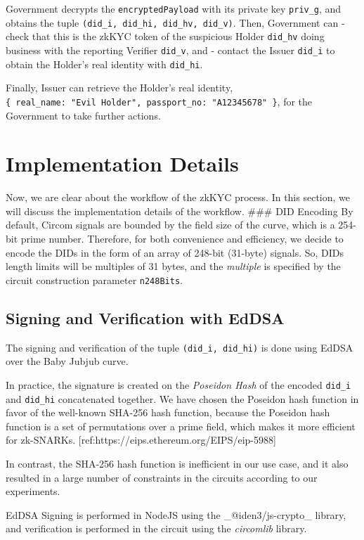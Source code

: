 \documentclass[
]{report}
\begin{document}
Government decrypts the \texttt{encryptedPayload} with its private key
\texttt{priv\_g}, and obtains the tuple
\texttt{(did\_i,\ did\_hi,\ did\_hv,\ did\_v)}. Then, Government can -
check that this is the zkKYC token of the suspicious Holder
\texttt{did\_hv} doing business with the reporting Verifier
\texttt{did\_v}, and - contact the Issuer \texttt{did\_i} to obtain the
Holder's real identity with \texttt{did\_hi}.

Finally, Issuer can retrieve the Holder's real identity,
\texttt{\{\ real\_name:\ "Evil\ Holder",\ passport\_no:\ "A12345678"\ \}},
for the Government to take further actions.

\section{Implementation Details}

Now, we are clear about the workflow of the zkKYC process. In this
section, we will discuss the implementation details of the workflow.
\#\#\# DID Encoding By default, Circom signals are bounded by the field
size of the curve, which is a 254-bit prime number. Therefore, for both
convenience and efficiency, we decide to encode the DIDs in the form of
an array of 248-bit (31-byte) signals. So, DIDs length limits will be
multiples of 31 bytes, and the \emph{multiple} is specified by the
circuit construction parameter \texttt{n248Bits}.

\subsection{Signing and Verification with
EdDSA}

The signing and verification of the tuple \texttt{(did\_i,\ did\_hi)} is
done using EdDSA over the Baby Jubjub curve.

In practice, the signature is created on the \emph{Poseidon Hash} of the
encoded \texttt{did\_i} and \texttt{did\_hi} concatenated together. We
have chosen the Poseidon hash function in favor of the well-known
SHA-256 hash function, because the Poseidon hash function is a set of
permutations over a prime field, which makes it more efficient for
zk-SNARKs.
{[}ref:https://eips.ethereum.org/EIPS/eip-5988{]}

In contrast, the SHA-256 hash function is inefficient in our use case,
and it also resulted in a large number of constraints in the circuits
according to our experiments.

EdDSA Signing is performed in NodeJS using the \_@iden3/js-crypto\_
library, and verification is performed in the circuit using the
\emph{circomlib} library.
\end{document}
